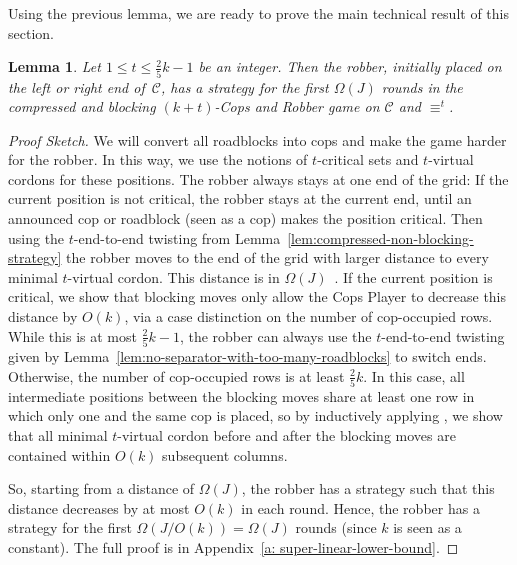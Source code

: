 \documentclass[10pt,a4paper]{article}
\newcommand{\comp}{\equiv}
\newcommand{\grid}{\mathcal{C}}
\newtheorem{lemma}[theorem]{Lemma}
\newcommand{\ifAppendix}[1]{#1}
\begin{document}
\noindent Using the previous lemma, we are ready to prove the main technical result of this section.
%
%

\begin{lemma}
        \label{lem:compression-lower-bound-blocking}
        Let $1\leq t \leq \frac{2}{5}k -1$ be an integer.
        Then the robber, initially placed on the left or right end of~$\grid$,
        has a strategy for the first $\Omega(J)$
        rounds in the compressed and blocking $(k+t)$-Cops and Robber game
        on $\grid$ and $\comp^t$.
\end{lemma}
\begin{proof}[Proof Sketch] 
        We will convert all roadblocks into cops
        and make the game harder for the robber. 
        In this way, we use the notions of $t$-critical sets
        and $t$-virtual cordons for these positions.
        The robber always stays at one end of the grid:
         If the current position is not critical, the robber stays at the current end, until an announced cop or roadblock (seen as a cop)
                makes the position critical.
                Then using the $t$-end-to-end twisting from Lemma~\ref{lem:compressed-non-blocking-strategy} the robber moves
                to the end of the grid
                with larger distance to every minimal $t$-virtual cordon.
                This distance is in $\Omega(J)$~\cite{RFJN024}.
        If the current position is critical, we show that 
                blocking moves only allow the Cops Player to decrease this distance by $O(k)$, via
a case distinction on the number of cop-occupied rows.
                While this is at most $\frac{2}{5}k-1$,
                the robber can always use the $t$-end-to-end twisting given by Lemma~\ref{lem:no-separator-with-too-many-roadblocks} to switch ends.
                 Otherwise, the number of cop-occupied rows is at least $\frac{2}{5}k$. In this case, all intermediate positions between the blocking moves
                share at least one row in which only one and the same cop is placed, so
                by inductively applying \cite[Proposition 4.10]{RFJN024},
                we  show that all minimal  $t$-virtual cordon before and after the blocking moves are contained within $O(k)$ subsequent columns. 
                
        So, starting from a distance of $\Omega(J)$,
        the robber has a strategy such that this distance decreases by at most $O(k)$ in each round.
        Hence, the robber has a strategy for the first
      $\Omega(J/O(k))=\Omega(J)$ rounds (since $k$ is seen as a constant).
      \ifAppendix{The full proof is in Appendix~\ref{a: super-linear-lower-bound}.}
 \end{proof}
\end{document}
